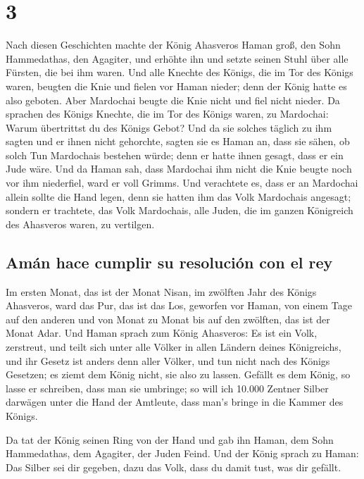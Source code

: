 \hypertarget{section-2}{%
\section{3}\label{section-2}}

 Nach diesen Geschichten machte der König Ahasveros Haman
groß, den Sohn Hammedathas, den Agagiter, und erhöhte ihn und setzte
seinen Stuhl über alle Fürsten, die bei ihm waren.  Und
alle Knechte des Königs, die im Tor des Königs waren, beugten die Knie
und fielen vor Haman nieder; denn der König hatte es also geboten. Aber
Mardochai beugte die Knie nicht und fiel nicht nieder.  Da
sprachen des Königs Knechte, die im Tor des Königs waren, zu Mardochai:
Warum übertrittst du des Königs Gebot?  Und da sie solches
täglich zu ihm sagten und er ihnen nicht gehorchte, sagten sie es Haman
an, dass sie sähen, ob solch Tun Mardochais bestehen würde; denn er
hatte ihnen gesagt, dass er ein Jude wäre.  Und da Haman
sah, dass Mardochai ihm nicht die Knie beugte noch vor ihm niederfiel,
ward er voll Grimms.  Und verachtete es, dass er an
Mardochai allein sollte die Hand legen, denn sie hatten ihm das Volk
Mardochais angesagt; sondern er trachtete, das Volk Mardochais, alle
Juden, die im ganzen Königreich des Ahasveros waren, zu vertilgen.

\hypertarget{amuxe1n-hace-cumplir-su-resoluciuxf3n-con-el-rey}{%
\subsection{Amán hace cumplir su resolución con el
rey}\label{amuxe1n-hace-cumplir-su-resoluciuxf3n-con-el-rey}}

 Im ersten Monat, das ist der Monat Nisan, im zwölften
Jahr des Königs Ahasveros, ward das Pur, das ist das Los, geworfen vor
Haman, von einem Tage auf den anderen und von Monat zu Monat bis auf den
zwölften, das ist der Monat Adar.  Und Haman sprach zum
König Ahasveros: Es ist ein Volk, zerstreut, und teilt sich unter alle
Völker in allen Ländern deines Königreichs, und ihr Gesetz ist anders
denn aller Völker, und tun nicht nach des Königs Gesetzen; es ziemt dem
König nicht, sie also zu lassen.  Gefällt es dem König, so
lasse er schreiben, dass man sie umbringe; so will ich 10.000 Zentner
Silber darwägen unter die Hand der Amtleute, dass man's bringe in die
Kammer des Königs.

 Da tat der König seinen Ring von der Hand und gab ihn
Haman, dem Sohn Hammedathas, dem Agagiter, der Juden Feind.
 Und der König sprach zu Haman: Das Silber sei dir
gegeben, dazu das Volk, dass du damit tust, was dir gefällt.

